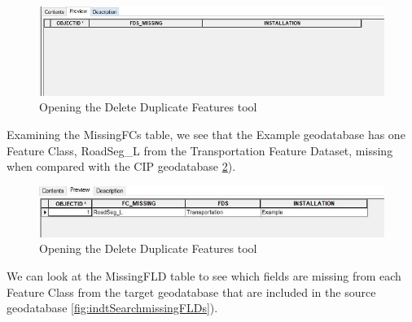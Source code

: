 \documentclass[openany]{book}
\theoremstyle{definition}
\theoremstyle{definition}
\theoremstyle{definition}
\theoremstyle{remark}
\begin{document}
\begin{figure}[H]

{\centering \includegraphics{figures/indtSearch-missingFDS} 

}

\caption{Opening the Delete Duplicate Features tool}\label{fig:indtSearchmissingFDS}
\end{figure}

Examining the MissingFCs table, we see that the Example geodatabase has
one Feature Class, RoadSeg\_L from the Transportation Feature Dataset,
missing when compared with the CIP geodatabase
\ref{fig:indtSearchmissingFCs}).

\begin{figure}[H]

{\centering \includegraphics{figures/indtSearch-missingFCs} 

}

\caption{Opening the Delete Duplicate Features tool}\label{fig:indtSearchmissingFCs}
\end{figure}

We can look at the MissingFLD table to see which fields are missing from
each Feature Class from the target geodatabase that are included in the
source geodatabase \ref{fig:indtSearchmissingFLDs}).
\end{document}
